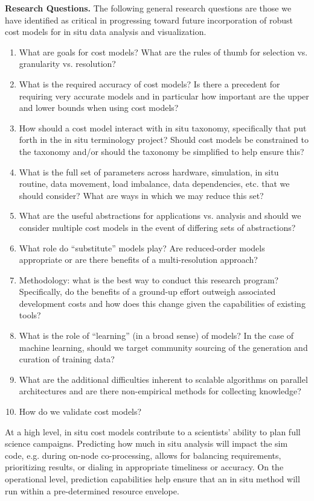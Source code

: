 \medskip\noindent
\textbf{\sffamily Research Questions.} 
The following general research questions are those we have identified as critical in progressing toward future incorporation of robust cost models for in situ data analysis and visualization.
\begin{enumerate}
    \item What are goals for cost models? What are the rules of thumb for selection vs. granularity vs. resolution?
    \item What is the required accuracy of cost models?  Is there a precedent for requiring very accurate models and in particular how important are the upper and lower bounds when using cost models?
    \item How should a cost model interact with in situ taxonomy, specifically that put forth in the in situ terminology project?  Should cost models be constrained to the taxonomy and/or should the taxonomy be simplified to help ensure this?
    \item What is the full set of parameters across hardware, simulation, in situ routine, data movement, load imbalance, data dependencies, etc. that we should consider?  What are ways in which we may reduce this set?
    \item What are the useful abstractions for applications vs. analysis and should we consider multiple cost models in the event of differing sets of abstractions?
    \item What role do “substitute” models play?  Are reduced-order models appropriate or are there benefits of a multi-resolution approach?
    \item Methodology: what is the best way to conduct this research program?  Specifically, do the benefits of a ground-up effort outweigh associated development costs and how does this change given the capabilities of existing tools?
    \item What is the role of “learning” (in a broad sense) of models?  In the case of machine learning, should we target community sourcing of the generation and curation of training data?
    \item What are the additional difficulties inherent to scalable algorithms on parallel architectures and are there non-empirical methods for collecting knowledge?
    \item How do we validate cost models?
\end{enumerate}

At a high level, in situ cost models contribute to a scientists’ ability to plan full science campaigns.  
Predicting how much in situ analysis will impact the sim code, e.g. during on-node co-processing, allows for balancing requirements, prioritizing results, or dialing in appropriate timeliness or accuracy.  
On the operational level, prediction capabilities help ensure that an in situ method will run within a pre-determined resource envelope.


